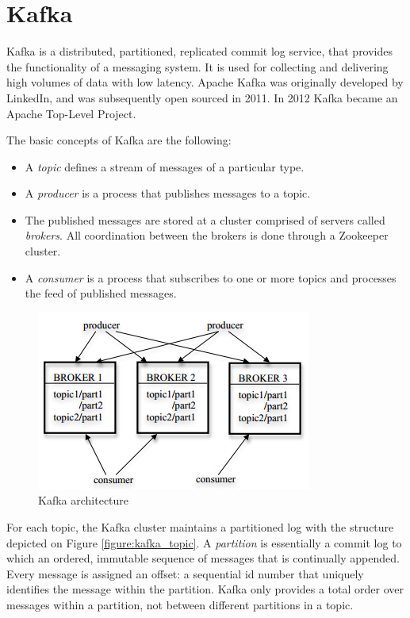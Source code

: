 \section{Kafka}

Kafka is a distributed, partitioned, replicated commit log service, that provides the functionality of a messaging system. It is used for collecting and delivering high volumes of data with low latency. Apache Kafka was originally developed by LinkedIn, and was subsequently open sourced in 2011. In 2012 Kafka became an Apache Top-Level Project.

The basic concepts of Kafka are the following:
\begin{itemize}
\item A \emph{topic} defines a stream of messages of a particular type.
\item A \emph{producer} is a process that publishes messages to a topic.
\item The published messages are stored at a cluster comprised of servers called \emph{brokers}. All coordination between the brokers is done through a Zookeeper cluster.
\item A \emph{consumer} is a process that subscribes to one or more topics and processes the feed of published messages.
\end{itemize}

\begin{figure}[H]
\centering
\includegraphics{figures/kafka_arch}
\caption{Kafka architecture}
\label{figure:kafka_arch}
\end{figure}

For each topic, the Kafka cluster maintains a partitioned log with the structure depicted on Figure \ref{figure:kafka_topic}. A \emph{partition} is essentially a commit log to which an ordered, immutable sequence of messages that is continually appended. Every message is assigned an offset: a sequential id number that uniquely identifies the message within the partition. Kafka only provides a total order over messages within a partition, not between different partitions in a topic.

